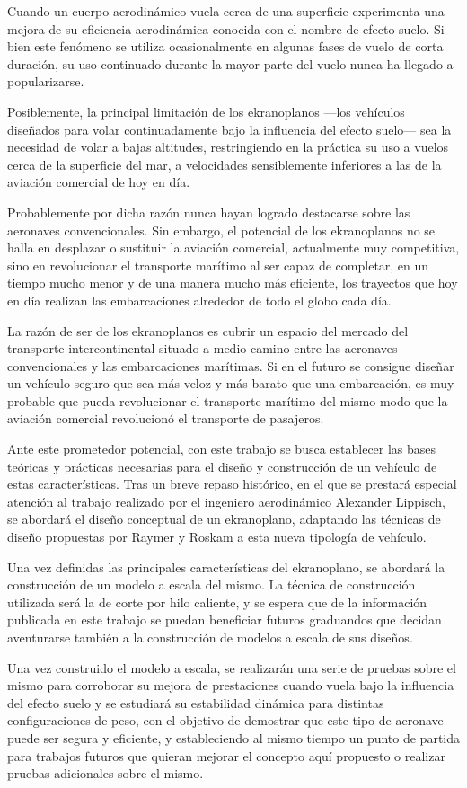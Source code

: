 Cuando un cuerpo aerodinámico vuela cerca de una superficie experimenta una mejora de su eficiencia aerodinámica conocida con el nombre de efecto suelo. Si bien este fenómeno se utiliza ocasionalmente en algunas fases de vuelo de corta duración, su uso continuado durante la mayor parte del vuelo nunca ha llegado a popularizarse.

Posiblemente, la principal limitación de los ekranoplanos —los vehículos diseñados para volar continuadamente bajo la influencia del efecto suelo— sea la necesidad de volar a bajas altitudes, restringiendo en la práctica su uso a vuelos cerca de la superficie del mar, a velocidades sensiblemente inferiores a las de la aviación comercial de hoy en día.

Probablemente por dicha razón nunca hayan logrado destacarse sobre las aeronaves convencionales. Sin embargo, el potencial de los ekranoplanos no se halla en desplazar o sustituir la aviación comercial, actualmente muy competitiva, sino en revolucionar el transporte marítimo al ser capaz de completar, en un tiempo mucho menor y de una manera mucho más eficiente, los trayectos que hoy en día realizan las embarcaciones alrededor de todo el globo cada día.

La razón de ser de los ekranoplanos es cubrir un espacio del mercado del transporte intercontinental situado a medio camino entre las aeronaves convencionales y las embarcaciones marítimas. Si en el futuro se consigue diseñar un vehículo seguro que sea más veloz y más barato que una embarcación, es muy probable que pueda revolucionar el transporte marítimo del mismo modo que la aviación comercial revolucionó el transporte de pasajeros.

Ante este prometedor potencial, con este trabajo se busca establecer las bases teóricas y prácticas necesarias para el diseño y construcción de un vehículo de estas características. Tras un breve repaso histórico, en el que se prestará especial atención al trabajo realizado por el ingeniero aerodinámico Alexander Lippisch, se abordará el diseño conceptual de un ekranoplano, adaptando las técnicas de diseño propuestas por Raymer\cite{ref:raymer}  y Roskam\cite{ref:roskam} a esta nueva tipología de vehículo.

Una vez definidas las principales características del ekranoplano, se abordará la construcción de un modelo a escala del mismo. La técnica de construcción utilizada será la de corte por hilo caliente, y se espera que de la información publicada en este trabajo se puedan beneficiar futuros graduandos que decidan aventurarse también a la construcción de modelos a escala de sus diseños.

Una vez construido el modelo a escala, se realizarán una serie de pruebas sobre el mismo para corroborar su mejora de prestaciones cuando vuela bajo la influencia del efecto suelo y se estudiará su estabilidad dinámica para distintas configuraciones de peso, con el objetivo de demostrar que este tipo de aeronave puede ser segura y eficiente, y estableciendo al mismo tiempo un punto de partida para trabajos futuros que quieran mejorar el concepto aquí propuesto o realizar pruebas adicionales sobre el mismo.
